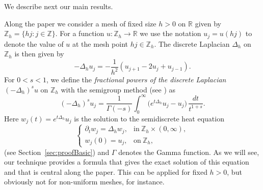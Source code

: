 \documentclass[a4paper,11pt,reqno]{amsart}
\newcommand{\R}{\mathbb{R}}
\newcommand{\Z}{\mathbb{Z}}
\theoremstyle{definition}
\numberwithin{equation}{section}
\begin{document}
We describe next our main results.

Along the paper we consider a mesh of fixed size $h>0$ on $\R$ given by
$\Z_h = \{ hj:j\in\Z\}$. For a function $u:\Z_h\to\R$ we use the notation
$u_j=u(hj)$
to denote the value of $u$ at the mesh point $hj\in\Z_h$.
The discrete Laplacian $\Delta_h$ on $\Z_h$ is then given by
\[
-\Delta_hu_j = -\frac{1}{h^2} (u_{j+1}-2u_{j}+u_{j-1}).
\]
For $0<s<1$, we define the \textit{fractional powers of the discrete Laplacian} $(-\Delta_h)^su$ on $\Z_h$
with the semigroup method (see \cite{Stinga, Stinga-Torrea}) as
\begin{equation}
\label{definition}
(-\Delta_h)^su_j=\frac{1}{\Gamma(-s)}\int_0^\infty\big(e^{t\Delta_h}u_j-u_j\big)\,\frac{dt}{t^{1+s}}.
\end{equation}
Here $w_j(t)=e^{t\Delta_h}u_j$ is the solution  to the semidiscrete heat equation
\begin{equation}
\label{eq:heatequation}
\begin{cases}
\partial_tw_j=\Delta_hw_j, &\text{in}~\Z_h\times(0,\infty),\\
w_j(0)=u_j, &\text{on}~\Z_h,
\end{cases}
\end{equation}
(see Section~\ref{sec:proofBasic}) and $\Gamma$ denotes the Gamma function.
As we will see, our technique provides a formula that gives the exact solution of this equation
and that is central along the paper.
This can be applied for fixed $h>0$, but obviously not for non-uniform meshes, for instance.
\end{document}
